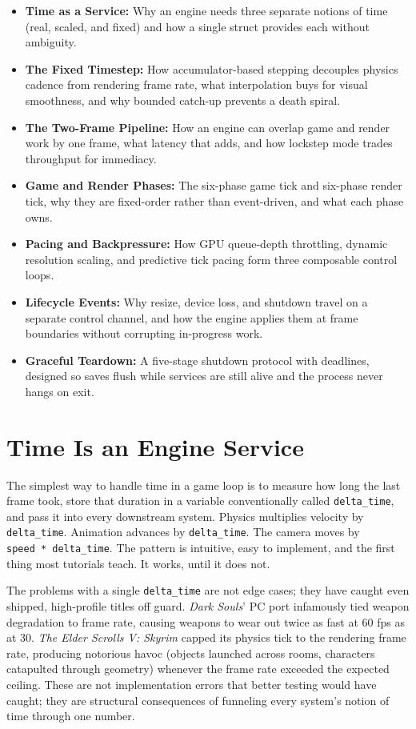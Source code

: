 \documentclass[
  11pt,
  letterpaper,
  DIV=11,
  numbers=noendperiod,
  twoside,
  open=right]{scrreprt}
\providecommand{\tightlist}{%
  \setlength{\itemsep}{0pt}\setlength{\parskip}{0pt}}
\begin{document}
\begin{itemize}
\tightlist
\item
  \textbf{Time as a Service:} Why an engine needs three separate notions
  of time (real, scaled, and fixed) and how a single struct provides
  each without ambiguity.
\item
  \textbf{The Fixed Timestep:} How accumulator-based stepping decouples
  physics cadence from rendering frame rate, what interpolation buys for
  visual smoothness, and why bounded catch-up prevents a death spiral.
\item
  \textbf{The Two-Frame Pipeline:} How an engine can overlap game and
  render work by one frame, what latency that adds, and how lockstep
  mode trades throughput for immediacy.
\item
  \textbf{Game and Render Phases:} The six-phase game tick and six-phase
  render tick, why they are fixed-order rather than event-driven, and
  what each phase owns.
\item
  \textbf{Pacing and Backpressure:} How GPU queue-depth throttling,
  dynamic resolution scaling, and predictive tick pacing form three
  composable control loops.
\item
  \textbf{Lifecycle Events:} Why resize, device loss, and shutdown
  travel on a separate control channel, and how the engine applies them
  at frame boundaries without corrupting in-progress work.
\item
  \textbf{Graceful Teardown:} A five-stage shutdown protocol with
  deadlines, designed so saves flush while services are still alive and
  the process never hangs on exit.
\end{itemize}

\section{Time Is an Engine Service}\label{time-is-an-engine-service}

The simplest way to handle time in a game loop is to measure how long
the last frame took, store that duration in a variable conventionally
called \texttt{delta\_time}, and pass it into every downstream system.
Physics multiplies velocity by \texttt{delta\_time}. Animation advances
by \texttt{delta\_time}. The camera moves by
\texttt{speed\ *\ delta\_time}. The pattern is intuitive, easy to
implement, and the first thing most tutorials teach. It works, until it
does not.

The problems with a single \texttt{delta\_time} are not edge cases; they
have caught even shipped, high-profile titles off guard. \emph{Dark
Souls}' PC port infamously tied weapon degradation to frame rate,
causing weapons to wear out twice as fast at 60 fps as at 30. \emph{The
Elder Scrolls V: Skyrim} capped its physics tick to the rendering frame
rate, producing notorious havoc (objects launched across rooms,
characters catapulted through geometry) whenever the frame rate exceeded
the expected ceiling. These are not implementation errors that better
testing would have caught; they are structural consequences of funneling
every system's notion of time through one number.
\end{document}

